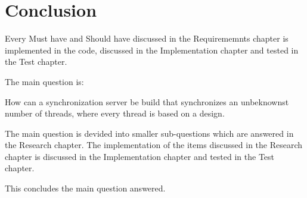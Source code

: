 \hypertarget{conclusion}{%
\chapter{Conclusion}\label{conclusion}}

Every Must have and Should have discussed in the Requirememnts chapter
is implemented in the code, discussed in the Implementation chapter and
tested in the Test chapter.

The main question is:

How can a synchronization server be build that synchronizes an
unbeknownst number of threads, where every thread is based on a design.

The main question is devided into smaller sub-questions which are
answered in the Research chapter. The implementation of the items
discussed in the Research chapter is discussed in the Implementation
chapter and tested in the Test chapter.

This concludes the main question answered.
